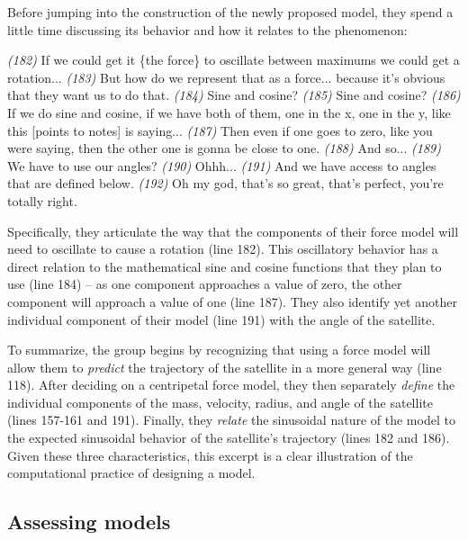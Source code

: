 \documentclass{msuphddissertation}
\begin{document}
\begin{doublespace}
Before jumping into the construction of the newly proposed model, they spend a little time discussing its behavior and how it relates to the phenomenon: \begin{description}
\SD \textit{(182)} If we could get it \{the force\} to oscillate between maximums we could get a rotation...
\SD \textit{(183)} But how do we represent that as a force... because it's obvious that they want us to do that.
\SA \textit{(184)} Sine and cosine?
\SD \textit{(185)} Sine and cosine?
\SA \textit{(186)} If we do sine and cosine, if we have both of them, one in the x, one in the y, like this [points to notes] is saying...
\SA \textit{(187)} Then even if one goes to zero, like you were saying, then the other one is gonna be close to one.
\SA \textit{(188)} And so...
\SD \textit{(189)} We have to use our angles?
\SC \textit{(190)} Ohhh...
\SD \textit{(191)} And we have access to angles {that are defined below}.
\SD \textit{(192)} Oh my god, that’s so great, that’s perfect, you're totally right.
\end{description}  Specifically, they articulate the way that the components of their force model will need to oscillate to cause a rotation (line 182).  This oscillatory behavior has a direct relation to the mathematical sine and cosine functions that they plan to use (line 184) -- as one component approaches a value of zero, the other component will approach a value of one (line 187).  They also identify yet another individual component of their model (line 191) with the angle of the satellite.

To summarize, the group begins by recognizing that using a force model will allow them to \textit{predict} the trajectory of the satellite in a more general way (line 118).  After deciding on a centripetal force model, they then separately \textit{define} the individual components of the mass, velocity, radius, and angle of the satellite (lines 157-161 and 191).  Finally, they \textit{relate} the sinusoidal nature of the model to the expected sinusoidal behavior of the satellite's trajectory (lines 182 and 186).  Given these three characteristics, this excerpt is a clear illustration of the computational practice of designing a model.

%
%
%
%
%
%
%
%
%
%
%
%
%
%
%
%

\subsection{Assessing models}


\end{doublespace}
\end{document}
